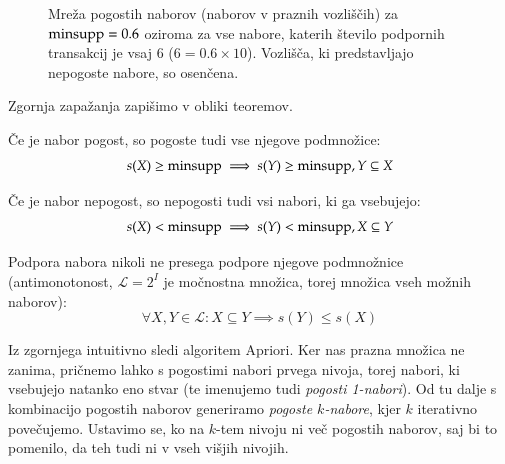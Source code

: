 \begin{figure}[htbp]
\caption{Mreža pogostih naborov (naborov v praznih vozliščih) za ${\rm minsupp}=0.6$ oziroma za vse nabore, katerih število podpornih transakcij je vsaj 6 ($6=0.6\times 10$). Vozlišča, ki predstavljajo nepogoste nabore, so osenčena.}
\label{f:mreza-pogostih-naborov}
\end{figure}

Zgornja zapažanja zapišimo v obliki teoremov.

\begin{teorem}
  Če je nabor pogost, so pogoste tudi vse njegove podmnožice:
  $$s(X)\geq{\rm minsupp}\implies s(Y)\geq{\rm minsupp}, Y\subseteq X$$
\end{teorem}

\begin{teorem}
  Če je nabor nepogost, so nepogosti tudi vsi nabori, ki ga vsebujejo:
  $$s(X)<{\rm minsupp}\implies s(Y)<{\rm minsupp}, X\subseteq Y$$
\end{teorem}

\begin{teorem}
  Podpora nabora nikoli ne presega podpore njegove podmnožnice (antimonotonost, ${\mathcal L}=2^I$ je močnostna množica, torej množica vseh možnih naborov):
  $$ \forall X,Y\in {\mathcal L}: X\subseteq Y\implies s(Y)\leq s(X) $$
\end{teorem}

Iz zgornjega intuitivno sledi algoritem Apriori. Ker nas prazna množica ne zanima, pričnemo lahko s pogostimi nabori prvega nivoja, torej nabori, ki vsebujejo natanko eno stvar (te imenujemo tudi {\em pogosti 1-nabori}). Od tu dalje s kombinacijo pogostih naborov generiramo {\em pogoste $k$-nabore}, kjer $k$ iterativno povečujemo. Ustavimo se, ko na $k$-tem nivoju ni več pogostih naborov, saj bi to pomenilo, da teh tudi ni v vseh višjih nivojih.


